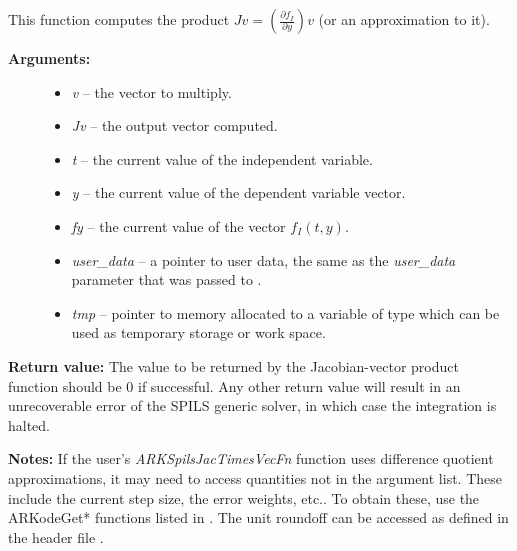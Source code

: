 \documentclass[letterpaper,10pt,english]{sphinxmanual}
\begin{document}
\begin{fulllineitems}
\label{c_interface/User_supplied:c.ARKSpilsJacTimesVecFn}
This function computes the product \(Jv =
\left(\frac{\partial f_I}{\partial y}\right)v\) (or an approximation to it).
\begin{description}
\item[{\textbf{Arguments:}}] \leavevmode\begin{itemize}
\item {} 
\emph{v} -- the vector to multiply.

\item {} 
\emph{Jv} -- the output vector computed.

\item {} 
\emph{t} -- the current value of the independent variable.

\item {} 
\emph{y} -- the current value of the dependent variable vector.

\item {} 
\emph{fy} -- the current value of the vector \(f_I(t,y)\).

\item {} 
\emph{user\_data} -- a pointer to user data, the same as the
\emph{user\_data} parameter that was passed to {\hyperref[c_interface/User_callable:c.ARKodeSetUserData]{\emph{}}}.

\item {} 
\emph{tmp} -- pointer to memory allocated to a variable of type
 which can be used as temporary storage or work space.

\end{itemize}

\end{description}

\textbf{Return value:}
The value to be returned by the Jacobian-vector product
function should be 0 if successful. Any other return value will
result in an unrecoverable error of the SPILS generic solver,
in which case the integration is halted.

\textbf{Notes:} If the user's \emph{ARKSpilsJacTimesVecFn} function uses
difference quotient approximations, it may need to access
quantities not in the argument list.  These include the current
step size, the error weights, etc..  To obtain these, use the
ARKodeGet* functions listed in
{\hyperref[c_interface/User_callable:cinterface-optionaloutputs]{\emph{}}}. The unit roundoff can be
accessed as  defined in the header file
.

\end{fulllineitems}
\end{document}
